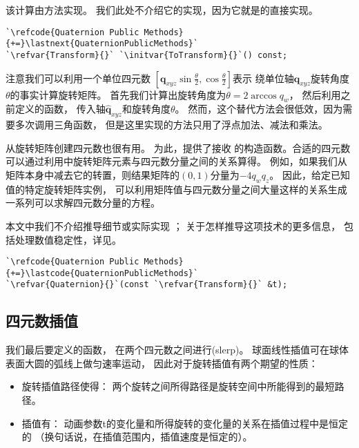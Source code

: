 该计算由方法实现。
我们此处不介绍它的实现，因为它就是的直接实现。
\begin{lstlisting}
`\refcode{Quaternion Public Methods}{+=}\lastnext{QuaternionPublicMethods}`
`\refvar{Transform}{}` `\initvar{ToTransform}{}`() const;
\end{lstlisting}

注意我们可以利用一个单位四元数
$\displaystyle[\bm q_{xyz}\sin\frac{\theta}{2},\cos\frac{\theta}{2}]$表示
绕单位轴$\hat{\bm q}_{xyz}$旋转角度$\theta$的事实计算旋转矩阵。
首先我们计算出旋转角度为$\theta=2\arccos q_w$，
然后利用之前定义的函数，
传入轴$\hat{\bm q}_{xyz}$和旋转角度$\theta$。
然而，这个替代方法会很低效，因为需要多次调用三角函数，
但是这里实现的方法只用了浮点加法、减法和乘法。

从旋转矩阵创建四元数也很有用。
为此，提供了接收
的构造函数。合适的四元数可以通过利用中旋转矩阵元素与四元数分量之间的关系算得。
例如，如果我们从矩阵本身中减去它的转置，则结果矩阵的$(0,1)$分量为$-4q_wq_z$。
因此，给定已知值的特定旋转矩阵实例，
可以利用矩阵值与四元数分量之间大量这样的关系生成一系列可以求解四元数分量的方程。

本文中我们不介绍推导细节或实际实现
；
关于怎样推导这项技术的更多信息，
包括处理数值稳定性，详见\citet{SHOEMAKE1991351}。

\begin{lstlisting}
`\refcode{Quaternion Public Methods}{+=}\lastcode{QuaternionPublicMethods}`
`\refvar{Quaternion}{}`(const `\refvar{Transform}{}` &t);
\end{lstlisting}

\subsection{四元数插值}\label{sub:四元数插值}
我们最后要定义的函数，
在两个四元数之间进行(slerp)。
球面线性插值可在球体表面大圆的弧线上做匀速率运动，
因此对于旋转插值有两个期望的性质：
\begin{itemize}
    \item 旋转插值路径使得：
          两个旋转之间所得路径是旋转空间中所能得到的最短路径。
    \item 插值有：
          动画参数{\ttfamily t}的变化量和所得旋转的变化量的关系在插值过程中是恒定的
          （换句话说，在插值范围内，插值速度是恒定的）。
\end{itemize}

